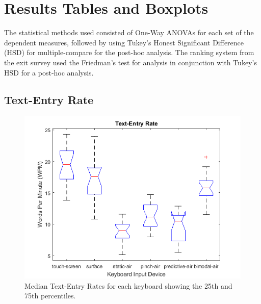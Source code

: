 \chapter{Results Tables and Boxplots}
The statistical methods used consisted of One-Way ANOVAs for each set of the dependent measures, followed by using Tukey's Honest Significant Difference (HSD) for multiple-compare for the post-hoc analysis. The ranking system from the exit survey used the Friedman's test for analysis in conjunction with Tukey's HSD for a post-hoc analysis.

\clearpage
\section{Text-Entry Rate}
\begin{figure}[h]
	\centering
	\includegraphics{fig_textentry_boxplot}
	\caption[Text-Entry Rate Boxplot]{Median Text-Entry Rates for each keyboard showing the 25th and 75th percentiles.}
	\label{fig_textentry_boxplot}
\end{figure}

